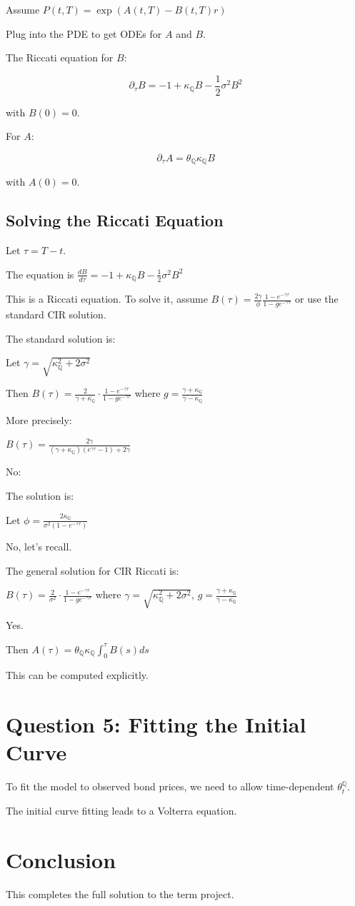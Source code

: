 \documentclass[11pt]{article}
\newcommand{\QQ}{\mathbb{Q}}
\begin{document}
Assume $P(t,T) = \exp(A(t,T) - B(t,T) r)$

Plug into the PDE to get ODEs for $A$ and $B$.

The Riccati equation for $B$:

\[
\partial_\tau B = -1 + \kappa_\QQ B - \frac{1}{2} \sigma^2 B^2
\]

with $B(0) = 0$.

For $A$:

\[
\partial_\tau A = \theta_\QQ \kappa_\QQ B
\]

with $A(0) = 0$.

\subsection{Solving the Riccati Equation}

Let $\tau = T - t$.

The equation is $\frac{dB}{d\tau} = -1 + \kappa_\QQ B - \frac{1}{2} \sigma^2 B^2$

This is a Riccati equation. To solve it, assume $B(\tau) = \frac{2\gamma}{\phi} \frac{1 - e^{-\gamma \tau}}{1 - g e^{-\gamma \tau}}$ or use the standard CIR solution.

The standard solution is:

Let $\gamma = \sqrt{\kappa_\QQ^2 + 2\sigma^2}$

Then $B(\tau) = \frac{2}{\gamma + \kappa_\QQ} \cdot \frac{1 - e^{-\gamma \tau}}{1 - g e^{-\gamma \tau}}$ where $g = \frac{\gamma + \kappa_\QQ}{\gamma - \kappa_\QQ}$

More precisely:

$B(\tau) = \frac{2 \gamma}{(\gamma + \kappa_\QQ)(e^{\gamma \tau} - 1) + 2\gamma}$

No:

The solution is:

Let $\phi = \frac{2 \kappa_\QQ}{\sigma^2 (1 - e^{-\gamma \tau})}$

No, let's recall.

The general solution for CIR Riccati is:

$B(\tau) = \frac{2}{\sigma^2} \cdot \frac{1 - e^{-\gamma \tau}}{1 - g e^{-\gamma \tau}}$ where $\gamma = \sqrt{\kappa_\QQ^2 + 2 \sigma^2}$, $g = \frac{\gamma + \kappa_\QQ}{\gamma - \kappa_\QQ}$

Yes.

Then $A(\tau) = \theta_\QQ \kappa_\QQ \int_0^\tau B(s) ds$

This can be computed explicitly.

\section{Question 5: Fitting the Initial Curve}

To fit the model to observed bond prices, we need to allow time-dependent $\theta_t^\QQ$.

The initial curve fitting leads to a Volterra equation.

\section{Conclusion}

This completes the full solution to the term project.
\end{document}
